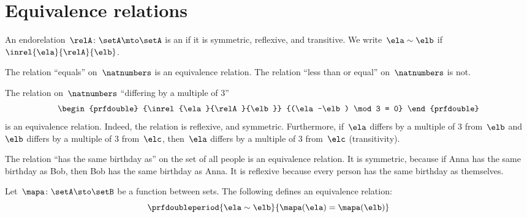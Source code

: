 
\section{Equivalence relations}

\begin{ctdefinition}
    \label{def:equivalence-relation}
    An endorelation~$\relA\colon \setA\mto \setA$ is an \emph{} if it is symmetric, reflexive, and transitive.
    We write~$\ela\sim \elb$ if~$\inrel{\ela}{\relA}{\elb}$.
\end{ctdefinition}

\begin{example}
    The relation ``equals'' on~$\natnumbers$ is an equivalence relation.
    The relation ``less than or equal'' on~$\natnumbers$ is not.
\end{example}

\begin{example}
    The relation on~$\natnumbers$ ``differing by a multiple of 3''
    \begin{equation*}
        \begin{prfdouble}
            {\inrel{\ela}{\relA}{\elb}}
            {(\ela-\elb) \mod 3 = 0}
        \end{prfdouble}
    \end{equation*}
    is an equivalence relation.
    Indeed, the relation is reflexive, and symmetric.
    Furthermore, if~$\ela$ differs by a multiple of 3 from~$\elb$ and~$\elb$ differs by a multiple of 3 from~$\elc$, then~$\ela$ differs by a multiple of 3 from~$\elc$ (transitivity).
\end{example}

\begin{example}
    The relation ``has the same birthday as'' on the set of all people is an equivalence relation.
    It is symmetric, because if Anna has the same birthday as Bob, then Bob has the same birthday as Anna.
    It is reflexive because every person has the same birthday as themselves.
\end{example}

\begin{example}
    Let~$\mapa\colon \setA \sto \setB$ be a function between sets.
    The following defines an equivalence relation:
    \begin{equation}
        \prfdoubleperiod{
            \ela\sim \elb
        }{
            \mapa(\ela)=\mapa(\elb)
        }
    \end{equation}
\end{example}

